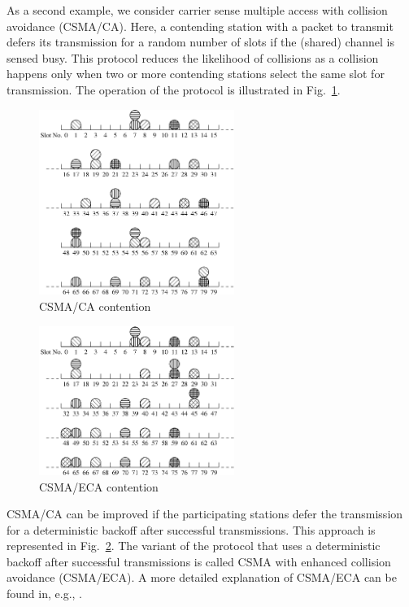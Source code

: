 \documentclass[journal]{IEEEtran}
\begin{document}
As a second example, we consider carrier sense multiple access with collision avoidance (CSMA/CA). Here, a contending station with a packet to transmit defers its transmission for a random number of slots if the (shared) channel is sensed busy.
This protocol reduces the likelihood of collisions as a collision happens only when two or more contending stations select the same slot for transmission.
The operation of the protocol is illustrated in Fig.~\ref{fig:csma_ca_compact}.

\begin{figure}
  \centering
  \includegraphics[width=2.5in]{figures/csma_ca_compact}
  \caption{CSMA/CA contention}
  \label{fig:csma_ca_compact}
\end{figure}
\begin{figure}
  \centering
  \includegraphics[width=2.5in]{figures/csma_eca_compact}
  \caption{CSMA/ECA contention}
  \label{fig:csma_eca_compact}
\end{figure}

CSMA/CA can be improved if the participating stations defer the transmission for a deterministic backoff after successful transmissions.
This approach is represented in Fig.~\ref{fig:csma_eca_compact}.
The variant of the protocol that uses a deterministic backoff after successful transmissions is called CSMA with enhanced collision avoidance (CSMA/ECA).
A more detailed explanation of CSMA/ECA can be found in, e.g., \cite{barcelo2008lba,barcelo2009tpc,he2009srb,fang2011dlm}.
\end{document}
